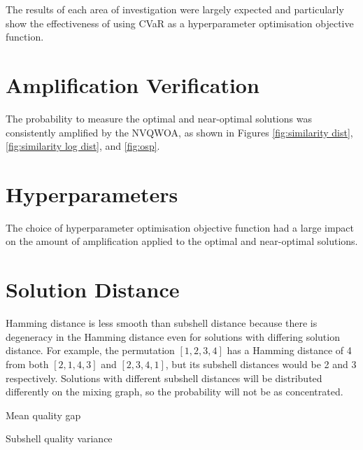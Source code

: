 The results of each area of investigation were largely expected and particularly show the effectiveness of using CVaR as a hyperparameter optimisation objective function.

\section{Amplification Verification}
The probability to measure the optimal and near-optimal solutions was consistently amplified by the NVQWOA, as shown in Figures \ref{fig:similarity dist}, \ref{fig:similarity log dist}, and \ref{fig:osp}.

\section{Hyperparameters}
The choice of hyperparameter optimisation objective function had a large impact on the amount of amplification applied to the optimal and near-optimal solutions. 

\section{Solution Distance}
Hamming distance is less smooth than subshell distance because there is degeneracy in the Hamming distance even for solutions with differing solution distance. For example, the permutation $[1,2,3,4]$ has a Hamming distance of 4 from both $[2,1,4,3]$ and $[2,3,4,1]$, but its subshell distances would be 2 and 3 respectively. Solutions with different subshell distances will be distributed differently on the mixing graph, so the probability will not be as concentrated.

Mean quality gap

Subshell quality variance